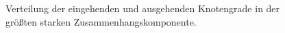 \begin{figure}[th!]
  \centering
  \caption{Verteilung der eingehenden  und
    ausgehenden  Knotengrade in der grö{\ss}ten
    starken Zusammenhangskomponente.}
  \label{fig:degree-dist}
\end{figure}

